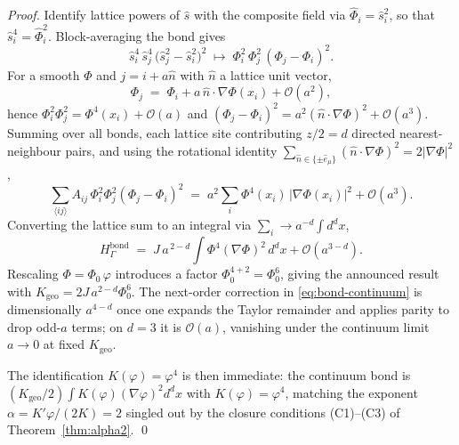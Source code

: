 \documentclass[11pt,a4paper]{article}
\renewcommand{\Phi}{\varPhi}
\begin{document}
\begin{proof}
Identify lattice powers of \(\hat{s}\) with the composite field via
\(\hat{\Phi}_{i}=\hat{s}_{i}^{2}\), so that
\(\hat{s}_{i}^{4}=\hat{\Phi}_{i}^{2}\). Block-averaging the bond gives
\begin{equation}\label{eq:bond-rewrite}
  \hat{s}_{i}^{4}\,\hat{s}_{j}^{4}\,
  \bigl(\hat{s}_{j}^{2}-\hat{s}_{i}^{2}\bigr)^{2}
  \;\longmapsto\;
  \Phi_{i}^{2}\,\Phi_{j}^{2}\,(\Phi_{j}-\Phi_{i})^{2}.
\end{equation}
For a smooth \(\Phi\) and \(j=i+a\hat{n}\) with \(\hat{n}\) a lattice
unit vector,
\begin{equation}\label{eq:taylor}
  \Phi_{j}\;=\;\Phi_{i}+a\,\hat{n}\!\cdot\!\nabla\Phi(x_{i})+\mathcal{O}(a^{2}),
\end{equation}
hence
\(\Phi_{i}^{2}\Phi_{j}^{2}=\Phi^{4}(x_{i})+\mathcal{O}(a)\) and
\((\Phi_{j}-\Phi_{i})^{2}=a^{2}(\hat{n}\!\cdot\!\nabla\Phi)^{2}
+\mathcal{O}(a^{3})\). Summing over all bonds, each lattice site
contributing \(z/2=d\) directed nearest-neighbour pairs, and using
the rotational identity \(\sum_{\hat{n}\in\{\pm\hat{e}_{\mu}\}}
(\hat{n}\!\cdot\!\nabla\Phi)^{2}=2|\nabla\Phi|^{2}\),
\begin{equation}\label{eq:bond-sum}
  \sum_{\langle ij\rangle}\!A_{ij}\,\Phi_{i}^{2}\Phi_{j}^{2}
  (\Phi_{j}-\Phi_{i})^{2}
  \;=\;a^{2}\!\sum_{i}\Phi^{4}(x_{i})\,|\nabla\Phi(x_{i})|^{2}
       +\mathcal{O}(a^{3}).
\end{equation}
Converting the lattice sum to an integral via
\(\sum_{i}\!\to a^{-d}\!\int d^{d}x\),
\begin{equation}\label{eq:bond-integral}
  H_{\Gamma}^{\mathrm{bond}}
  \;=\;J\,a^{\,2-d}\!\int\!\Phi^{4}(\nabla\Phi)^{2}\,d^{d}x
       +\mathcal{O}(a^{3-d}).
\end{equation}
Rescaling \(\Phi=\Phi_{0}\,\varphi\) introduces a factor
\(\Phi_{0}^{4+2}=\Phi_{0}^{6}\), giving the announced result with
\(K_{\mathrm{geo}}=2J\,a^{2-d}\Phi_{0}^{6}\). The next-order correction
in \eqref{eq:bond-continuum} is dimensionally \(a^{4-d}\) once one
expands the Taylor remainder and applies parity to drop odd-\(a\)
terms; on \(d=3\) it is \(\mathcal{O}(a)\), vanishing under the
continuum limit \(a\to 0\) at fixed \(K_{\mathrm{geo}}\).

The identification \(K(\varphi)=\varphi^{4}\) is then immediate: the
continuum bond is \((K_{\mathrm{geo}}/2)\!\int\!K(\varphi)
(\nabla\varphi)^{2}d^{d}x\) with \(K(\varphi)=\varphi^{4}\), matching
the exponent \(\alpha=K'\!\varphi/(2K)=2\) singled out by the closure
conditions (C1)--(C3) of Theorem~\ref{thm:alpha2}.
\qed
\end{proof}
\end{document}
